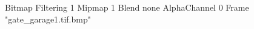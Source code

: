 {Bitmap
	{Filtering 1}
	{Mipmap 1}
	{Blend none}
	{AlphaChannel 0}
	{Frame "gate_garage1.tif.bmp"}
}
